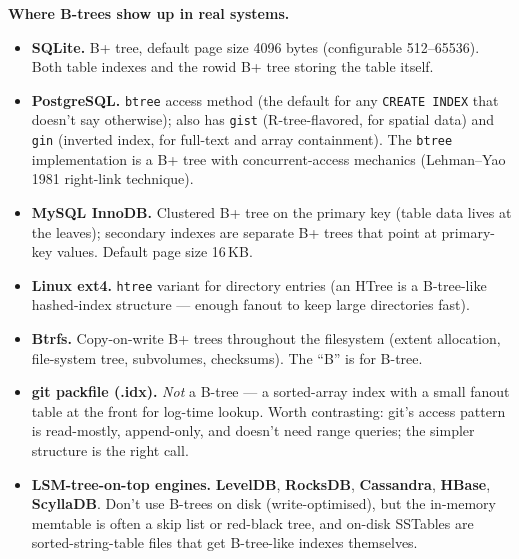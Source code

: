 \documentclass[11pt]{article}
\begin{document}
\begin{notebox}
\textbf{Where B-trees show up in real systems.}
\begin{itemize}[leftmargin=*]
    \item \textbf{SQLite.} B+ tree, default page size 4096 bytes
          (configurable 512--65536). Both table indexes and the
          rowid B+ tree storing the table itself.
    \item \textbf{PostgreSQL.} \texttt{btree} access method (the
          default for any \texttt{CREATE INDEX} that doesn't say
          otherwise); also has \texttt{gist} (R-tree-flavored, for
          spatial data) and \texttt{gin} (inverted index, for
          full-text and array containment). The \texttt{btree}
          implementation is a B+ tree with concurrent-access
          mechanics (Lehman--Yao 1981 right-link technique).
    \item \textbf{MySQL InnoDB.} Clustered B+ tree on the primary
          key (table data lives at the leaves); secondary indexes
          are separate B+ trees that point at primary-key values.
          Default page size 16\,KB.
    \item \textbf{Linux ext4.} \texttt{htree} variant for directory
          entries (an HTree is a B-tree-like hashed-index structure
          --- enough fanout to keep large directories fast).
    \item \textbf{Btrfs.} Copy-on-write B+ trees throughout the
          filesystem (extent allocation, file-system tree,
          subvolumes, checksums). The ``B'' is for B-tree.
    \item \textbf{git packfile (.idx).} \emph{Not} a B-tree --- a
          sorted-array index with a small fanout table at the front
          for log-time lookup. Worth contrasting: git's access
          pattern is read-mostly, append-only, and doesn't need
          range queries; the simpler structure is the right call.
    \item \textbf{LSM-tree-on-top engines.} \textbf{LevelDB},
          \textbf{RocksDB}, \textbf{Cassandra}, \textbf{HBase},
          \textbf{ScyllaDB}. Don't use B-trees on disk
          (write-optimised), but the in-memory memtable is often a
          skip list or red-black tree, and on-disk SSTables are
          sorted-string-table files that get B-tree-like indexes
          themselves.
\end{itemize}


\end{notebox}
\end{document}
